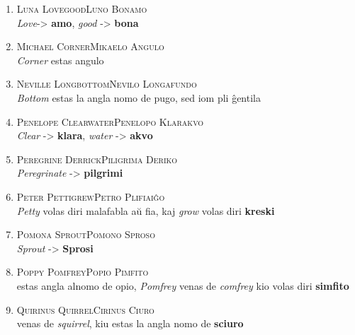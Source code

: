 \begin{enumerate}
\item\label{nomoj:bonamo} \textsc{Luna Lovegood}\dotfill \textsc{Luno Bonamo}\\
{\footnotesize \indent \emph {Love}-> \textbf{amo}, \emph{good} -> \textbf{bona}}
\smallskip

\item\label{nomoj:angulo} \textsc{Michael Corner}\dotfill \textsc{Mikaelo Angulo}\\
{\footnotesize \indent \emph{Corner} estas angulo}
\smallskip

\item\label{nomoj:longafundo} \textsc{Neville Longbottom}\dotfill \textsc{Nevilo Longafundo}\\
{\footnotesize \indent \emph{Bottom} estas la angla nomo de pugo, sed iom pli ĝentila}
\smallskip

\item\label{nomoj:klarakvo} \textsc{Penelope Clearwater}\dotfill \textsc{Penelopo Klarakvo}\\
{\footnotesize \indent \emph{Clear} -> \textbf{klara}, \emph{water} -> \textbf{akvo}}
\smallskip

\item\label{nomoj:deriko} \textsc{Peregrine Derrick}\dotfill \textsc{Piligrima Deriko}\\
{\footnotesize \indent \emph{Peregrinate} -> \textbf{pilgrimi}}
\smallskip

\item\label{nomoj:plifiaiĝo} \textsc{Peter Pettigrew}\dotfill \textsc{Petro Plifiaiĝo}\\
{\footnotesize \indent \emph{Petty} volas diri malafabla aŭ fia, kaj \emph{grow} volas diri \textbf{kreski}}
\smallskip

\item\label{nomoj:sproso} \textsc{Pomona Sprout}\dotfill \textsc{Pomono Sproso}\\
{\footnotesize \indent \emph{Sprout} -> \textbf{Sprosi}}
\smallskip

\item\label{nomoj:pimfito} \textsc{Poppy Pomfrey}\dotfill \textsc{Popio Pimfito}\\
{\footnotesize {} estas angla alnomo de opio, \emph{Pomfrey} venas de \emph{comfrey} kio volas diri \textbf{simfito}}
\smallskip

\item\label{nomoj:ciuro} \textsc{Quirinus Quirrel}\dotfill \textsc{Cirinus Ciuro}\\
{\footnotesize {} venas de \emph{squirrel}, kiu estas la angla nomo de \textbf{sciuro}}
\smallskip


\end{enumerate}
